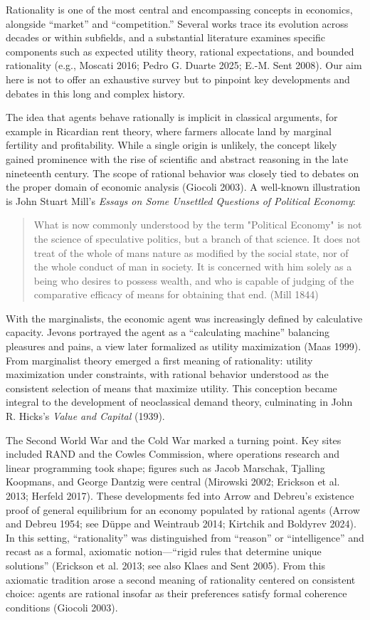 \documentclass[
]{interact}
\begin{document}
Rationality is one of the most central and encompassing concepts in
economics, alongside ``market'' and ``competition.'' Several works trace
its evolution across decades or within subfields, and a substantial
literature examines specific components such as expected utility theory,
rational expectations, and bounded rationality (e.g., Moscati 2016;
Pedro G. Duarte 2025; E.-M. Sent 2008). Our aim here is not to offer an
exhaustive survey but to pinpoint key developments and debates in this
long and complex history.

The idea that agents behave rationally is implicit in classical
arguments, for example in Ricardian rent theory, where farmers allocate
land by marginal fertility and profitability. While a single origin is
unlikely, the concept likely gained prominence with the rise of
scientific and abstract reasoning in the late nineteenth century. The
scope of rational behavior was closely tied to debates on the proper
domain of economic analysis (Giocoli 2003). A well-known illustration is
John Stuart Mill's \emph{Essays on Some Unsettled Questions of Political
Economy}:

\begin{quote}
What is now commonly understood by the term "Political Economy" is not
the science of speculative politics, but a branch of that science. It
does not treat of the whole of man\textquotesingle s nature as modified
by the social state, nor of the whole conduct of man in society. It is
concerned with him solely as a being who desires to possess wealth, and
who is capable of judging of the comparative efficacy of means for
obtaining that end. (Mill 1844)
\end{quote}

With the marginalists, the economic agent was increasingly defined by
calculative capacity. Jevons portrayed the agent as a ``calculating
machine'' balancing pleasures and pains, a view later formalized as
utility maximization (Maas 1999). From marginalist theory emerged a
first meaning of rationality: utility maximization under constraints,
with rational behavior understood as the consistent selection of means
that maximize utility. This conception became integral to the
development of neoclassical demand theory, culminating in John R.
Hicks's \emph{Value and Capital} (1939).

The Second World War and the Cold War marked a turning point. Key sites
included RAND and the Cowles Commission, where operations research and
linear programming took shape; figures such as Jacob Marschak, Tjalling
Koopmans, and George Dantzig were central (Mirowski 2002; Erickson et
al. 2013; Herfeld 2017). These developments fed into Arrow and Debreu's
existence proof of general equilibrium for an economy populated by
rational agents (Arrow and Debreu 1954; see Düppe and Weintraub 2014;
Kirtchik and Boldyrev 2024). In this setting, ``rationality'' was
distinguished from ``reason'' or ``intelligence'' and recast as a
formal, axiomatic notion---``rigid rules that determine unique
solutions'' (Erickson et al. 2013; see also Klaes and Sent 2005). From
this axiomatic tradition arose a second meaning of rationality centered
on consistent choice: agents are rational insofar as their preferences
satisfy formal coherence conditions (Giocoli 2003).
\end{document}
